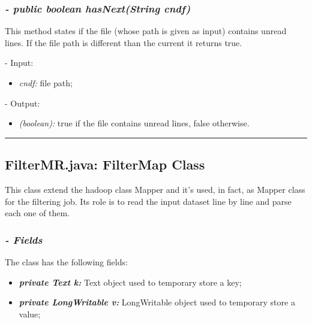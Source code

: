 \documentclass[]{report}
\begin{document}
	\subsubsection*{\textit{\textbf{-} public boolean hasNext(String cndf)}}   	
	This method states if the file (whose path is given as input) contains unread lines. If the file path is different than the current it returns true.  
	\begin{description}
		\item - Input:
		\begin{itemize}
			\item \textit{cndf:} file path;
		\end{itemize}
	\end{description}
	\begin{description}
		\item - Output:
		\begin{itemize}
			\item \textit{(boolean):} true if the file contains unread lines, false otherwise. 
		\end{itemize}
	\end{description}
	
	\rule{\textwidth}{0.4pt}
	
	
	\subsection*{FilterMR.java: FilterMap Class}
	
	This class extend the hadoop class Mapper and it's used, in fact, as Mapper class for the filtering job. Its role is to read the input dataset line by line and parse each one of them. 
	
	\subsubsection*{\textit{\textbf{-} Fields}} 
	The class has the following fields:
	\begin{itemize}
		\item \textit{\textbf{private Text k:}} Text object used to temporary store a key;
		\item \textit{\textbf{private LongWritable v:}} LongWritable object used to temporary store a value; 
	\end{itemize}
	
\end{document}
